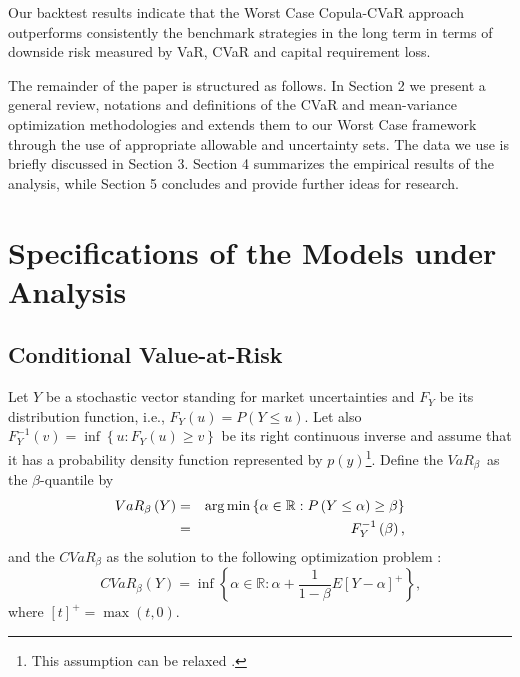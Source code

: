 \documentclass[a4paper,10pt]{article}
\begin{document}
 Our backtest results indicate
that the Worst Case Copula-CVaR approach outperforms consistently the
benchmark strategies in the long term in terms of downside risk measured by VaR, CVaR and capital requirement loss. 

The remainder of the paper is structured as follows. In Section 2 we present
a general review, notations and definitions of the CVaR and mean-variance
optimization methodologies and extends them to our Worst Case framework
through the use of appropriate allowable and uncertainty sets. The data we
use is briefly discussed in Section 3. Section 4 summarizes the empirical
results of the analysis, while Section 5 concludes and provide further ideas
for research.

\section{Specifications of the Models under Analysis}

\label{section2}

\subsection{Conditional Value-at-Risk}

Let $Y$ be a stochastic vector standing for market uncertainties and $F_{Y}$
be its distribution function, i.e., $F_{Y}\left( u\right) =P\left( Y\leq
u\right) $. Let also $F_{Y}^{-1}\left( v\right) =\inf \left\{ u:F_{Y}\left(
u\right) \geq v\right\} $ be its right continuous inverse and assume that it
has a probability density function represented by $p(y)$\footnote{%
	This assumption can be relaxed \citep{uryasev2013}.}. Define the $VaR_{\beta
}$\thinspace\ as the $\beta $-quantile by
\begin{eqnarray}
VaR_{\beta }\left( Y\right) &=& \arg \min \left\{ \alpha \in
\mathbb{R}
:P\left( Y\leq \alpha \right) \geq \beta \right\}  \label{one} \\
&=&F_{Y}^{-1}\left( \beta \right) \text{,}  \notag
\end{eqnarray}%
and the $CVaR_{\beta }$ as the solution to the following optimization
problem \citep{pflug2000}:
\begin{equation}
CVaR_{\beta }\left( Y\right) =\inf \left\{ \alpha \in
\mathbb{R}
:\alpha +\frac{1}{1-\beta }E\left[ Y-\alpha \right] ^{+}\right\} \text{,}
\label{two}
\end{equation}%
where $\left[ t\right] ^{+}=\max \left( t,0\right) $.
\end{document}
